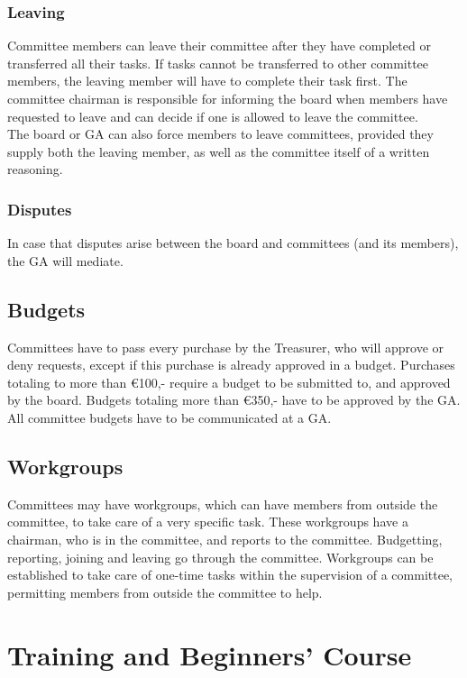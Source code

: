 \documentclass[a4paper]{article}
\begin{document}
\subsubsection{Leaving}
Committee members can leave their committee after they have completed or transferred all their tasks. If tasks cannot be transferred to other committee members, the leaving member will have to complete their task first. The committee chairman is responsible for informing the board when members have requested to leave and can decide if one is allowed to leave the committee. \\ 

The board or { GA} can also force members to leave committees, provided they supply both the leaving member, as well as the committee itself of a written reasoning.

\subsubsection{Disputes}
In case that disputes arise between the board and committees (and its members), the { GA} will mediate.

\subsection{Budgets}
Committees have to pass every purchase by the Treasurer, who will approve or deny requests, except if this purchase is already approved in a budget. Purchases totaling to more than €100,- require a budget to be submitted to, and approved by the board. Budgets totaling more than €350,- have to be approved by the { GA}. All committee budgets have to be communicated at a { GA}.

\subsection{Workgroups}
Committees may have workgroups, which can have members from outside the committee, to take care of a very specific task. These workgroups have a chairman, who is in the committee, and reports to the committee. Budgetting, reporting, joining and leaving go through the committee. Workgroups can be established to take care of one-time tasks within the supervision of a committee, permitting members from outside the committee to help.

\section{Training and Beginners' Course}
\end{document}
